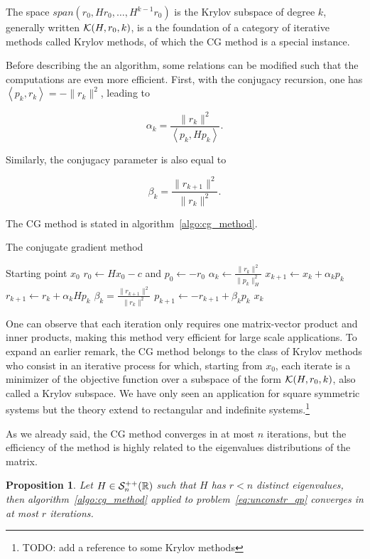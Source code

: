 \documentclass[10pt]{article}
\newtheorem{proposition}[theorem]{Proposition}
\numberwithin{equation}{section}
\newcommand{\scal}[2]{\left\langle {#1} , {#2} \right\rangle} %
\begin{document}
	The space $span(r_0,Hr_0,\ldots,H^{k-1}r_0)$ is the Krylov subspace of degree $k$, generally written ${\mathcal{K}}(H,r_0,k)$, is a the foundation of a category of iterative methods called Krylov methods, of which the CG method is a special instance. 
	
	Before describing the an algorithm, some relations can be modified such that the computations are even more efficient. First, with the conjugacy recursion, one has $\scal{p_k}{r_k} = - \|r_k\|^2$, leading to 
	
	\[\alpha_k = \dfrac{\|r_k\|^2}{\scal{p_k}{Hp_k}}.\]
	
	Similarly, the conjugacy parameter is also equal to 
	
	\[\beta_k = \dfrac{\|r_{k+1}\|^2}{\|r_k\|^2}.\]
	
	The CG method is stated in algorithm~\ref{algo:cg_method}.
	
	\begin{algorithm}
		\caption{The conjugate gradient method}\label{algo:cg_method}
		\begin{algorithmic}
			\Require Starting point $x_0$
			\State $r_0 \gets Hx_0-c$ and $p_0 \gets -r_0$
				\State $\alpha_k \gets \frac{\|r_k\|^2}{\|p_k\|^2_H}$
				\State $x_{k+1} \gets x_k+\alpha_kp_k$
				\State $r_{k+1} \gets r_k + \alpha_kHp_k$
				\State $\beta_k =  \frac{\|r_{k+1}\|^2}{\|r_k\|^2}$
				\State $p_{k+1} \gets -r_{k+1}+\beta_kp_k$
			\EndFor{}
			\Return $x_k$
		\end{algorithmic}
	\end{algorithm} 
	
	 One can observe that each iteration only requires one matrix-vector product and inner products, making this method very efficient for large scale applications. To expand an earlier remark, the CG method belongs to the class of Krylov methods who consist in an iterative process for which, starting from $x_0$, each iterate is a minimizer of the objective function over a subspace of the form ${\mathcal{K}}(H,r_0,k)$, also called a Krylov subspace. We have only seen an application for square symmetric systems but the theory extend to rectangular and indefinite systems.\footnote{TODO: add a reference to some Krylov methods}
	 
	 As we already said, the CG method converges in at most $n$ iterations, but the efficiency of the method is highly related to the eigenvalues distributions of the matrix.
	 
	 \begin{proposition}
	 	Let $H\in {\mathcal{S}}_n^{++}({\mathbb{R}})$ such that $H$ has $r<n$ distinct eigenvalues, then algorithm~\ref{algo:cg_method} applied to problem~\eqref{eq:unconstr_qp} converges in at most $r$ iterations. 
	 \end{proposition}
	 
\end{document}
